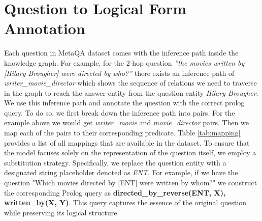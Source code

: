 \documentclass[11pt]{article}
\begin{document}
\section{Question to Logical Form Annotation}
\label{ap:annotation}

Each question in MetaQA dataset comes with the inference path inside the knowledge graph. For example, for the 2-hop question \emph{”the movies
written by [Hilary Brougher] were directed by who?”} there exists an inference path of \emph{writer\_movie\_director} which shows the sequence of relations we need to traverse in the graph to reach the answer entity from the question entity \emph{Hilary Brougher}. We use this inference path and annotate the question with the correct prolog query. To do so, we first break down the inference path into pairs. For the example above we would get \emph{writer\_movie} and \emph{movie\_director} pairs. Then we map each of the pairs to their corresponding predicate. Table \ref{tab:mapping} provides a list of all mappings that are available in the dataset. To ensure that the model focuses solely on the representation of the question itself, we employ a substitution strategy. Specifically, we replace the question entity with a designated string placeholder denoted as \emph{ENT}. For example, if we have the question "Which movies directed by [ENT] were written by whom?" we construct the corresponding Prolog query as \textbf{directed\_by\_reverse(ENT, X), written\_by(X, Y)}. This query captures the essence of the original question while preserving its logical structure
\end{document}
